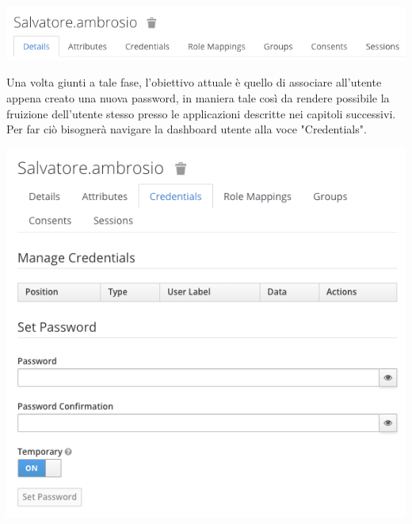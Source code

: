 \documentclass[twoside]{report}
\begin{document}
\begin{center}
\begin{minipage}{0.6\linewidth}
    \vspace{2mm}
    \centering
    \includegraphics[width= \linewidth]{8.png}
    \vspace{2mm}
\end{minipage}
\end{center}

Una volta giunti a tale fase, l'obiettivo attuale è quello di associare all'utente appena creato una nuova password, in maniera tale così da rendere possibile la fruizione dell'utente stesso presso le applicazioni descritte nei capitoli successivi.
\bigbreak
Per far ciò bisognerà navigare la dashboard utente alla voce "Credentials".

\begin{center}
\begin{minipage}{0.6\linewidth}
    \vspace{2mm}
    \centering
    \includegraphics[width= \linewidth]{9.png}
    \vspace{2mm}
\end{minipage}
\end{center}
\end{document}

